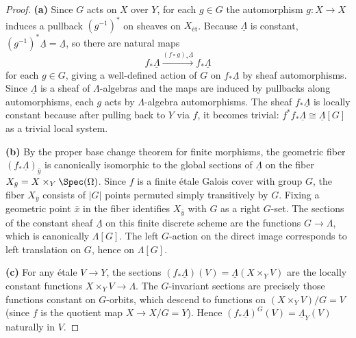 \begin{proof}
\textbf{(a)} Since $G$ acts on $X$ over $Y$, for each $g \in G$ the automorphism $g: X \to X$ induces a pullback $(g^{-1})^*$ on sheaves on $X_{\text{ét}}$. Because $\underline{\Lambda}$ is constant, $(g^{-1})^*\underline{\Lambda} = \underline{\Lambda}$, so there are natural maps
$$ f_*\underline{\Lambda} \xrightarrow{(f \circ g)_* \underline{\Lambda}} f_*\underline{\Lambda} $$
for each $g \in G$, giving a well-defined action of $G$ on $f_*\underline{\Lambda}$ by sheaf automorphisms. Since $\underline{\Lambda}$ is a sheaf of $\Lambda$-algebras and the maps are induced by pullbacks along automorphisms, each $g$ acts by $\Lambda$-algebra automorphisms. The sheaf $f_*\underline{\Lambda}$ is locally constant because after pulling back to $Y$ via $f$, it becomes trivial: $f^* f_* \underline{\Lambda} \cong \underline{\Lambda}[G]$ as a trivial local system.

\textbf{(b)} By the proper base change theorem for finite morphisms, the geometric fiber $(f_*\underline{\Lambda})_{\bar{y}}$ is canonically isomorphic to the global sections of $\underline{\Lambda}$ on the fiber $X_{\bar{y}} = X \times_Y \Spec(\Omega)$. Since $f$ is a finite étale Galois cover with group $G$, the fiber $X_{\bar{y}}$ consists of $|G|$ points permuted simply transitively by $G$. Fixing a geometric point $\bar{x}$ in the fiber identifies $X_{\bar{y}}$ with $G$ as a right $G$-set. The sections of the constant sheaf $\underline{\Lambda}$ on this finite discrete scheme are the functions $G \to \Lambda$, which is canonically $\Lambda[G]$. The left $G$-action on the direct image corresponds to left translation on $G$, hence on $\Lambda[G]$.

\textbf{(c)} For any étale $V \to Y$, the sections $(f_*\underline{\Lambda})(V) = \underline{\Lambda}(X \times_Y V)$ are the locally constant functions $X \times_Y V \to \Lambda$. The $G$-invariant sections are precisely those functions constant on $G$-orbits, which descend to functions on $(X \times_Y V)/G = V$ (since $f$ is the quotient map $X \to X/G = Y$). Hence $(f_*\underline{\Lambda})^G(V) = \underline{\Lambda}_Y(V)$ naturally in $V$.
\end{proof}
